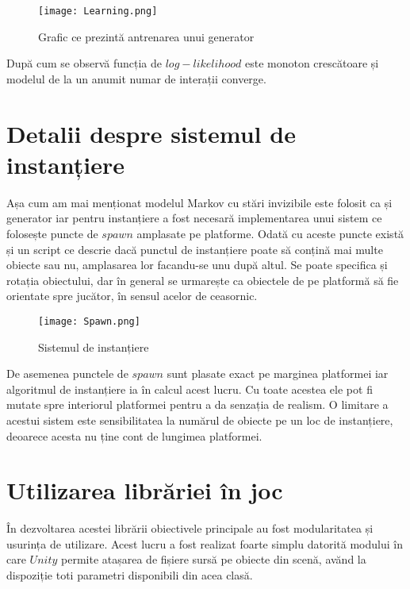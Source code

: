\vspace{10mm}
\begin{figure}[H]
\centering
\texttt{[image: Learning.png]} \par
\caption{Grafic ce prezintă antrenarea unui generator}
\end{figure}

După cum se observă funcția de $log-likelihood$ este monoton crescătoare și modelul de la un anumit numar de interații converge.\par

\section{Detalii despre sistemul de instanțiere}

Așa cum am mai menționat modelul Markov cu stări invizibile este folosit ca și generator iar pentru instanțiere a fost necesară implementarea unui sistem ce folosește puncte de $spawn$ amplasate pe platforme. Odată cu aceste puncte există și un script ce descrie dacă punctul de instanțiere poate să conțină mai multe obiecte sau nu, amplasarea lor facandu-se unu după altul. Se poate specifica și rotația obiectului, dar în general se urmarește ca obiectele de pe platformă să fie orientate spre jucător, în sensul acelor de ceasornic.\par

\vspace{10mm}
\begin{figure}[H]
\centering
\texttt{[image: Spawn.png]} \par
\caption{Sistemul de instanțiere}
\end{figure}

De asemenea punctele de $spawn$ sunt plasate exact pe marginea platformei iar algoritmul de instanțiere ia în calcul acest lucru. Cu toate acestea ele pot fi mutate spre interiorul platformei pentru a da senzația de realism. O limitare a acestui sistem este sensibilitatea la numărul de obiecte pe un loc de instanțiere, deoarece acesta nu ține cont de lungimea platformei.\par

\section{Utilizarea librăriei în joc}

În dezvoltarea acestei librării obiectivele principale au fost modularitatea și usurința de utilizare. Acest lucru a fost realizat foarte simplu datorită modului în care $Unity$ permite atașarea de fișiere sursă pe obiecte din scenă, avănd la dispoziție toti parametri disponibili din acea clasă.\par

